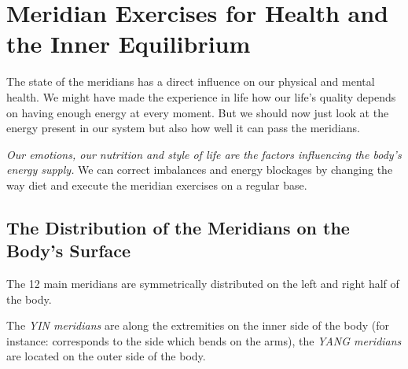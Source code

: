 \documentclass[../Book.Stress_regulation.tex]{subfiles}
\begin{document}
\chapter[Meridian Exercises]{Meridian Exercises for Health and the Inner Equilibrium}

The state of the meridians has a direct influence on our physical and mental health. We might have made the experience in life how our life's quality depends on having enough energy at every moment.
But we should now just look at the energy present in our system but also how well it can pass the meridians.

\emph{Our emotions, our nutrition and style of life are  the factors influencing the body's energy supply.}
We can correct imbalances and energy blockages by changing the way diet and execute the meridian exercises on a regular base.

\section{The Distribution of the Meridians on the Body's Surface}

The 12 main meridians are symmetrically distributed on the left and right half of the body.

The \emph{YIN meridians} are along the extremities on the inner side of the body (for instance: corresponds to the side which bends on the arms),
the \emph{YANG meridians} are located on the outer side of the body.
\end{document}
